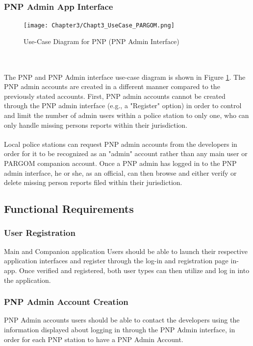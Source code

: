 \subsubsection{PNP Admin App Interface}

\begin{figure}[!h]
    \centering
    \texttt{[image: Chapter3/Chapt3\_UseCase\_PARGOM.png]}
    \caption{Use-Case Diagram for PNP (PNP Admin Interface)}
    \label{fig:UseCasePNP}
\end{figure}
\\\\The PNP and PNP Admin interface use-case diagram is shown in Figure \ref{fig:UseCasePNP}. The PNP admin accounts are created in a different manner compared to the previously stated accounts. First, PNP admin accounts cannot be created through the PNP admin interface (e.g., a "Register" option) in order to control and limit the number of admin users within a police station to only one, who can only handle missing persons reports within their jurisdiction. 
\\\\Local police stations can request PNP admin accounts from the developers in order for it to be recognized as an "admin" account rather than any main user or PARGOM companion account. Once a PNP admin has logged in to the PNP admin interface, he or she, as an official, can then browse and either verify or delete missing person reports filed within their jurisdiction.

\subsection{Functional Requirements}
\subsubsection{User Registration}
Main and Companion application Users should be able to launch their respective application interfaces and register through the log-in and registration page in-app. Once verified and registered, both user types can then utilize and log in into the application. 

\subsubsection{PNP Admin Account Creation}
PNP Admin accounts users should be able to contact the developers using the information displayed about logging in through the PNP Admin interface, in order for each PNP station to have a PNP Admin Account. 

